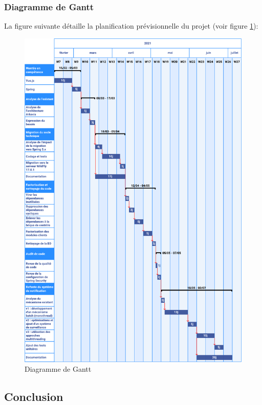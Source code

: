 \subsubsection{Diagramme de Gantt}
La figure suivante détaille la planification prévisionnelle du projet (voir figure \ref{fig:gantt}):\\
\begin{figure}[H]
    \begin{center}
        \includegraphics[width=\linewidth]{images/sec3/gantt.pdf}
        \caption{Diagramme de Gantt}
        \label{fig:gantt}
    \end{center}
\end{figure}

\subsection*{Conclusion}
